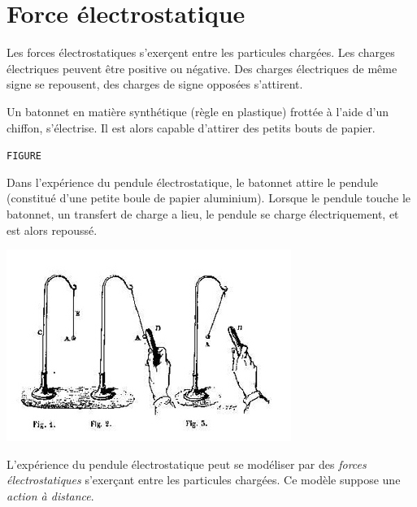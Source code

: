 
\section{Force électrostatique}
%

Les forces électrostatiques s'exerçent entre les particules chargées. Les charges électriques peuvent être positive ou négative.
Des charges électriques de même signe se repousent, des charges de signe opposées s'attirent.

%
Un batonnet en matière synthétique (règle en plastique) frottée à l'aide d'un chiffon, s'électrise. Il est alors capable d'attirer des petits bouts de papier.

\begin{center}
\texttt{FIGURE}
\end{center}

 Dans l'expérience du pendule électrostatique, le batonnet attire le pendule (constitué d'une petite boule de papier aluminium).
Lorsque le pendule touche le batonnet, un transfert de charge a lieu, le pendule se charge électriquement, et est alors repoussé.

\begin{center}
\includegraphics[scale=0.9]{./theorieDesChamps/MascartTraiteDElectriciteStatique1876}
\end{center}

L'expérience du pendule électrostatique peut se modéliser par des {\it forces électrostatiques} s'exerçant entre les particules chargées. Ce modèle suppose une {\it action à distance}.


